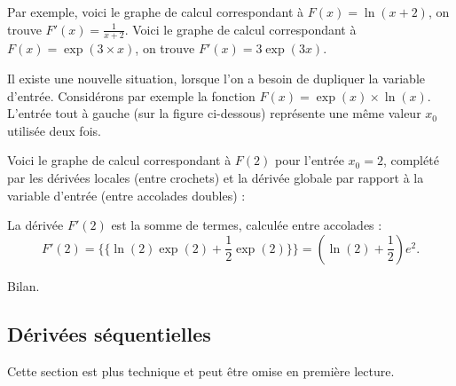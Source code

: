 \documentclass[11pt,class=report,crop=false]{standalone}
\begin{document}
Par exemple, voici le graphe de calcul correspondant à $F(x) = \ln(x+2)$, on trouve $F'(x) = \frac{1}{x+2}$.
Voici le graphe de calcul correspondant à $F(x) = \exp(3\times x)$, on trouve $F'(x) = 3\exp(3x)$.

Il existe une nouvelle situation, lorsque l'on a besoin de dupliquer la variable d'entrée. Considérons par exemple la fonction $F(x) = \exp(x)\times \ln(x)$.
L'entrée \og{}\textbullet\fg{} tout à gauche (sur la figure ci-dessous) représente une même valeur $x_0$ utilisée deux fois.




Voici le graphe de calcul correspondant à $F(2)$ pour l'entrée $x_0=2$, complété par les dérivées locales (entre crochets) et la dérivée globale par rapport à la variable d'entrée (entre accolades doubles) :

La dérivée $F'(2)$ est la somme de termes, calculée entre accolades  :
$$F'(2) = \{\{ \ln(2)\exp(2) + \frac12\exp(2) \}\} = \left(\ln(2)+\frac12\right)e^2.$$



Bilan.



\subsection{Dérivées séquentielles}

Cette section est plus technique et peut être omise %
en première lecture.

\bigskip
\end{document}

